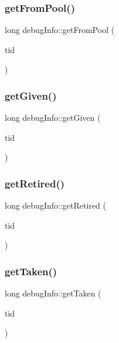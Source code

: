 \subsubsection{\texorpdfstring{get\+From\+Pool()}{getFromPool()}}
{\footnotesize\ttfamily long debug\+Info\+::get\+From\+Pool (\begin{DoxyParamCaption}\item[{const int}]{tid }\end{DoxyParamCaption})\hspace{0.3cm}{\ttfamily [inline]}}

\mbox{\label{classdebugInfo_a22c975a6619fe71f966e8a9df1be2a8d}} 
\subsubsection{\texorpdfstring{get\+Given()}{getGiven()}}
{\footnotesize\ttfamily long debug\+Info\+::get\+Given (\begin{DoxyParamCaption}\item[{const int}]{tid }\end{DoxyParamCaption})\hspace{0.3cm}{\ttfamily [inline]}}

\mbox{\label{classdebugInfo_a141e5d59d2070dea2cd3127443f7600d}} 
\subsubsection{\texorpdfstring{get\+Retired()}{getRetired()}}
{\footnotesize\ttfamily long debug\+Info\+::get\+Retired (\begin{DoxyParamCaption}\item[{const int}]{tid }\end{DoxyParamCaption})\hspace{0.3cm}{\ttfamily [inline]}}

\mbox{\label{classdebugInfo_a0c57a9fdca59cd9621acb2c9120ba637}} 
\subsubsection{\texorpdfstring{get\+Taken()}{getTaken()}}
{\footnotesize\ttfamily long debug\+Info\+::get\+Taken (\begin{DoxyParamCaption}\item[{const int}]{tid }\end{DoxyParamCaption})\hspace{0.3cm}{\ttfamily [inline]}}

